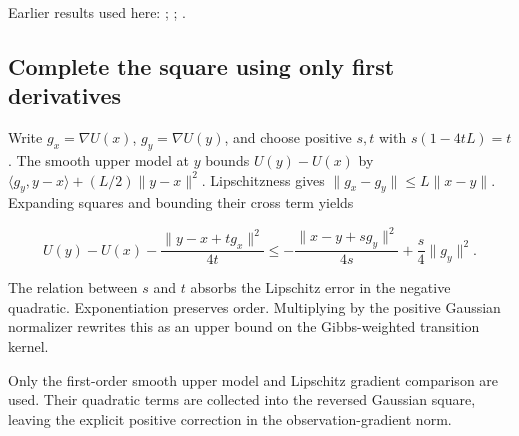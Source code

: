 \documentclass[11pt,a4paper]{report}
\begin{document}
Earlier results used here: \cite[Section~3.37.1]{LangevinLean2026ULASC}; \cite[Section~3.37.12]{LangevinLean2026ULASC}; \cite[Section~3.37.2]{LangevinLean2026ULASC}.
\subsection{\texorpdfstring{Complete the square using only first derivatives}{Complete the square using only first derivatives}}
\label{report-step-UnadjustedLangevin-LSI-GibbsInterpolationBound-lean-2}


Write \(g_x=\nabla U(x)\), \(g_y=\nabla U(y)\), and choose positive \(s,t\) with \(s(1-4tL)=t\). The smooth upper model at \(y\) bounds \(U(y)-U(x)\) by \(\langle g_y,y-x\rangle+(L/2)\|y-x\|^2\). Lipschitzness gives \(\|g_x-g_y\|\le L\|x-y\|\). Expanding squares and bounding their cross term yields

\[U(y)-U(x)-\frac{\|y-x+tg_x\|^2}{4t}\le-\frac{\|x-y+sg_y\|^2}{4s}+\frac s4\|g_y\|^2.\]

The relation between \(s\) and \(t\) absorbs the Lipschitz error in the negative quadratic. Exponentiation preserves order. Multiplying by the positive Gaussian normalizer rewrites this as an upper bound on the Gibbs-weighted transition kernel.



Only the first-order smooth upper model and Lipschitz gradient comparison are used. Their quadratic terms are collected into the reversed Gaussian square, leaving the explicit positive correction in the observation-gradient norm.
\end{document}
